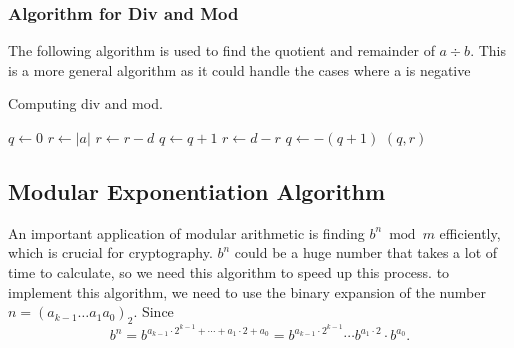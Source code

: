     \subsubsection*{Algorithm for Div and Mod}
        The following algorithm is used to find the quotient and remainder of $a \div b$.
        This is a more general algorithm as it could handle the cases where a is negative
    \begin{algorithm}
        \caption{Computing div and mod.}
        \begin{algorithmic}
            \State $q \gets 0$
            \State $r \gets |a|$
                \State $r \gets r - d$
                \State $q \gets q + 1$
            \EndWhile
                \State $r \gets d - r$
                \State $q \gets -(q + 1)$
            \EndIf
            \State \Return $(q, r)$ 
        \EndProcedure
        \end{algorithmic}
        \end{algorithm}
    
    \subsection{Modular Exponentiation Algorithm}
    An important application of modular arithmetic is finding \( b^n \bmod m\) efficiently, which is crucial for cryptography. $b^n$ could be a huge
    number that takes a lot of time to calculate, so we need this algorithm to speed up this process. to implement this algorithm, we need to use the
    binary expansion of the number $n=(a_{k-1}\ldots a_1a_0)_2$.
    Since 
    $$
    b^n=b^{a_{k-1}\cdot2^{k-1}+\cdots+a_1\cdot2+a_0}=b^{a_{k-1}\cdot2^{k-1}}\cdots b^{a_1\cdot2}\cdot b^{a_0}.
    $$

